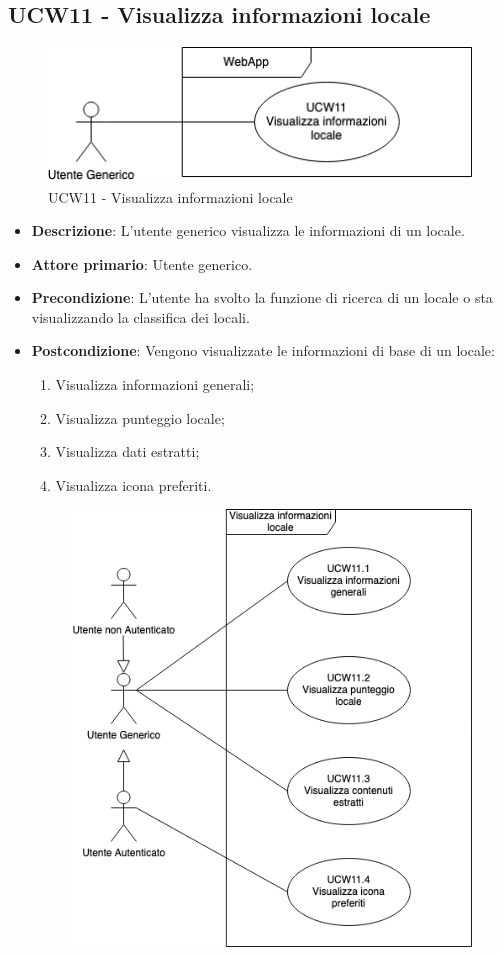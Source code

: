 \subsection{UCW11 - Visualizza informazioni locale}
\begin{figure}[!h]
\centering
\includegraphics[scale=0.5]{UC_images/UCW11.png} 
\caption{UCW11 - Visualizza informazioni locale}
\end{figure}
\begin{itemize}
    \item \textbf{Descrizione}: L'utente generico visualizza le informazioni di un locale.
    \item \textbf{Attore primario}: Utente generico.
    \item \textbf{Precondizione}: L'utente ha svolto la funzione di ricerca di un locale o sta visualizzando la classifica dei locali.
    \item \textbf{Postcondizione}: Vengono visualizzate le informazioni di base di un locale:
    \begin{enumerate}
        \item Visualizza informazioni generali;
        \item Visualizza punteggio locale;
        \item Visualizza dati estratti;
        \item Visualizza icona preferiti.
        \end{enumerate}
    \begin{figure}[H]
	\centering
		\includegraphics[scale=0.5]{UC_images/UCW11-.png} 

\end{figure}
\end{itemize}
